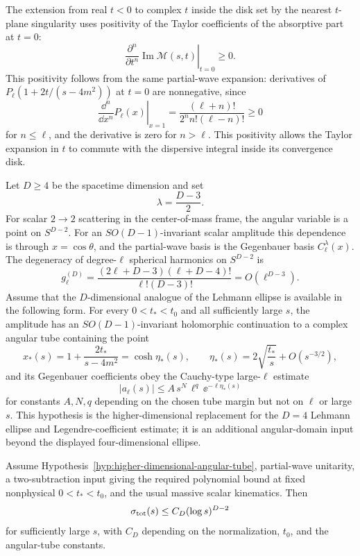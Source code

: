 The extension from real \(t<0\) to complex \(t\) inside the disk set by the
nearest \(t\)-plane singularity uses positivity of the Taylor coefficients of
the absorptive part at \(t=0\):
\[
  \left.
  \frac{\partial^n}{\partial t^n}
  \operatorname{Im}\mathcal M(s,t)
  \right|_{t=0}
  \ge0 .
\]
This positivity follows from the same partial-wave expansion: derivatives of
\(P_\ell(1+2t/(s-4m^2))\) at \(t=0\) are nonnegative, since
\[
  \left.\frac{\dd^n}{\dd x^n}P_\ell(x)\right|_{x=1}
  =
  \frac{(\ell+n)!}{2^n n!(\ell-n)!}
  \ge0
\]
for \(n\le\ell\), and the derivative is zero for \(n>\ell\).  This positivity
allows the Taylor expansion in \(t\) to commute with the dispersive integral
inside its convergence disk.

\begin{hypothesis}
\label{hyp:higher-dimensional-angular-tube}
Let \(D\ge4\) be the spacetime dimension and set
\[
  \lambda=\frac{D-3}{2}.
\]
For scalar \(2\to2\) scattering in the center-of-mass frame, the angular
variable is a point on \(S^{D-2}\).  For an \(SO(D-1)\)-invariant scalar
amplitude this dependence is through \(x=\cos\theta\), and the partial-wave
basis is the Gegenbauer basis \(C_\ell^\lambda(x)\).  The degeneracy of
degree-\(\ell\) spherical harmonics on \(S^{D-2}\) is
\[
  g_\ell^{(D)}
  =
  \frac{(2\ell+D-3)(\ell+D-4)!}{\ell!(D-3)!}
  =
  O(\ell^{D-3}).
\]
Assume that the \(D\)-dimensional analogue of the Lehmann ellipse is available
in the following form.  For every \(0<t_*<t_0\) and all sufficiently large
\(s\), the amplitude has an \(SO(D-1)\)-invariant holomorphic continuation to
a complex angular tube containing the point
\[
  x_*(s)=1+\frac{2t_*}{s-4m^2}
  =
  \cosh\eta_*(s),
  \qquad
  \eta_*(s)=2\sqrt{\frac{t_*}{s}}+O(s^{-3/2}),
\]
and its Gegenbauer coefficients obey the Cauchy-type large-\(\ell\) estimate
\[
  |a_\ell(s)|\le A\,s^N\,\ell^q\,\ee^{-\ell\eta_*(s)}
\]
for constants \(A,N,q\) depending on the chosen tube margin but not on
\(\ell\) or large \(s\).  This hypothesis is the higher-dimensional
replacement for the \(D=4\) Lehmann ellipse and Legendre-coefficient estimate;
it is an additional angular-domain input beyond the displayed
four-dimensional ellipse.
\end{hypothesis}

\begin{proposition}
\label{prop:higher-dimensional-froissart-counting}
Assume Hypothesis~\ref{hyp:higher-dimensional-angular-tube}, partial-wave
unitarity, a two-subtraction input giving the required polynomial bound at
fixed nonphysical \(0<t_*<t_0\), and the usual massive scalar kinematics.
Then
\[
  \sigma_{\rm tot}(s)\le C_D(\log s)^{D-2}
\]
for sufficiently large \(s\), with \(C_D\) depending on the normalization,
\(t_0\), and the angular-tube constants.
\end{proposition}

